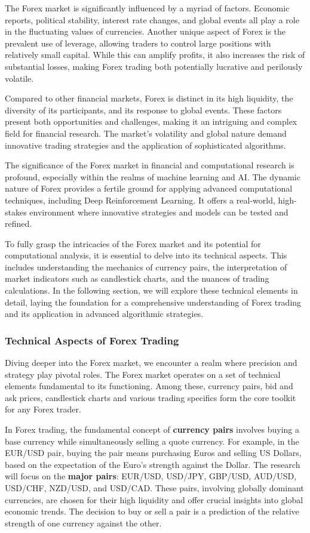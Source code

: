 The Forex market is significantly influenced by a myriad of factors. Economic reports, political stability, interest rate changes, and global events all play a role in the fluctuating values of currencies. Another unique aspect of Forex is the prevalent use of leverage, allowing traders to control large positions with relatively small capital. While this can amplify profits, it also increases the risk of substantial losses, making Forex trading both potentially lucrative and perilously volatile.

Compared to other financial markets, Forex is distinct in its high liquidity, the diversity of its participants, and its response to global events. These factors present both opportunities and challenges, making it an intriguing and complex field for financial research. The market's volatility and global nature demand innovative trading strategies and the application of sophisticated algorithms.

The significance of the Forex market in financial and computational research is profound, especially within the realms of machine learning and AI. The dynamic nature of Forex provides a fertile ground for applying advanced computational techniques, including Deep Reinforcement Learning. It offers a real-world, high-stakes environment where innovative strategies and models can be tested and refined.

To fully grasp the intricacies of the Forex market and its potential for computational analysis, it is essential to delve into its technical aspects. This includes understanding the mechanics of currency pairs, the interpretation of market indicators such as candlestick charts, and the nuances of trading calculations. In the following section, we will explore these technical elements in detail, laying the foundation for a comprehensive understanding of Forex trading and its application in advanced algorithmic strategies.

\subsubsection{Technical Aspects of Forex Trading}
Diving deeper into the Forex market, we encounter a realm where precision and strategy play pivotal roles. The Forex market operates on a set of technical elements fundamental to its functioning. Among these, currency pairs, bid and ask prices, candlestick charts and various trading specifics form the core toolkit for any Forex trader.

In Forex trading, the fundamental concept of \textbf{currency pairs} involves buying a base currency while simultaneously selling a quote currency. For example, in the EUR/USD pair, buying the pair means purchasing Euros and selling US Dollars, based on the expectation of the Euro's strength against the Dollar. The research will focus on the \textbf{major pairs}: EUR/USD, USD/JPY, GBP/USD, AUD/USD, USD/CHF, NZD/USD, and USD/CAD. These pairs, involving globally dominant currencies, are chosen for their high liquidity and offer crucial insights into global economic trends. The decision to buy or sell a pair is a prediction of the relative strength of one currency against the other.

